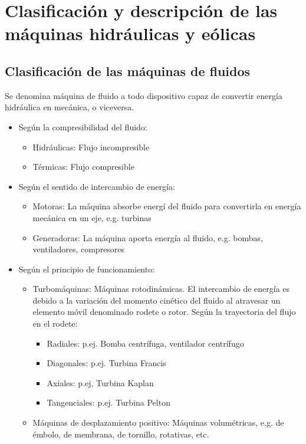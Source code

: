\chapter{Clasificación y descripción de las máquinas hidráulicas y eólicas}
\section{Clasificación de las máquinas de fluidos}
Se denomina máquina de fluido a todo dispositivo capaz de convertir energía hidráulica en mecánica, o viceversa.

\begin{itemize}
    \item Según la compresibilidad del fluido:
    \begin{itemize}
        \item Hidráulicas: Flujo incompresible
        \item Térmicas: Flujo compresible
    \end{itemize}
    \item Según el sentido de intercambio de energía:
    \begin{itemize}
        \item Motoras: La máquina absorbe energí del fluido para convertirla en energía mecánica en un eje, e.g. turbinas
        \item Generadoras: La máquina aporta energía al fluido, e.g. bombas, ventiladores, compresores
    \end{itemize}
    \item Según el principio de funcionamiento:
    \begin{itemize}
        \item Turbomáquinas: Máquinas rotodinámicas. El intercambio de energía es debido a la variación del momento cinético del fluido al atravesar un elemento móvil denominado rodete o rotor.
        Según la trayectoria del flujo en el rodete:
        \begin{itemize}
            \item Radiales: p.ej. Bomba centrífuga, ventilador centrífugo
            \item Diagonales: p.ej. Turbina Francis
            \item Axiales: p.ej, Turbina Kaplan
            \item Tangenciales: p.ej. Turbina Pelton
        \end{itemize}
        \item Máquinas de desplazamiento positivo: Máquinas volumétricas, e.g. de émbolo, de membrana, de tornillo, rotativas, etc.
    \end{itemize}
\end{itemize}

